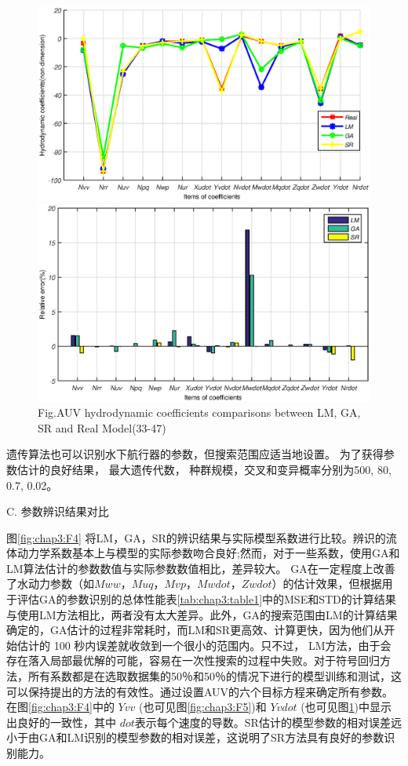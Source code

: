 \begin{figure}[!htp]
\centering
\includegraphics[width=14cm]{figure/chap3/four_33_47.eps}
\includegraphics[width=14cm]{figure/chap3/relative_error_33_47.eps}
\label{fig:chap3:F7}
 {Fig.}{AUV hydrodynamic coefficients comparisons between LM, GA, SR and Real Model(33-47)}
\end{figure}

遗传算法也可以识别水下航行器的参数，但搜索范围应适当地设置。 为了获得参数估计的良好结果， 最大遗传代数， 种群规模，交叉和变异概率分别为500, 80, 0.7, 0.02。

C. 参数辨识结果对比

图\ref{fig:chap3:F4} 将LM，GA，SR的辨识结果与实际模型系数进行比较。辨识的流体动力学系数基本上与模型的实际参数吻合良好;然而，对于一些系数，使用GA和LM算法估计的参数数值与实际参数数值相比，差异较大。 GA在一定程度上改善了水动力参数（如$Mww$，$Muq$，$Mvp$，$Mwdot$，$Zwdot$）的估计效果，但根据用于评估GA的参数识别的总体性能表\ref{tab:chap3:table1}中的MSE和STD的计算结果与使用LM方法相比，两者没有太大差异。此外，GA的搜索范围由LM的计算结果确定的，GA估计的过程非常耗时，而LM和SR更高效、计算更快，因为他们从开始估计的 100 秒内误差就收敛到一个很小的范围内。只不过， LM方法，由于会存在落入局部最优解的可能，容易在一次性搜索的过程中失败。对于符号回归方法，所有系数都是在选取数据集的50％和50％的情况下进行的模型训练和测试，这可以保持提出的方法的有效性。通过设置AUV的六个目标方程来确定所有参数。在图\ref{fig:chap3:F4}中的 $Yvv$ (也可见图\ref{fig:chap3:F5})和 $Yvdot$ (也可见图\ref{fig:chap3:F7})中显示出良好的一致性，其中 $dot$表示每个速度的导数。SR估计的模型参数的相对误差远小于由GA和LM识别的模型参数的相对误差，这说明了SR方法具有良好的参数识别能力。

